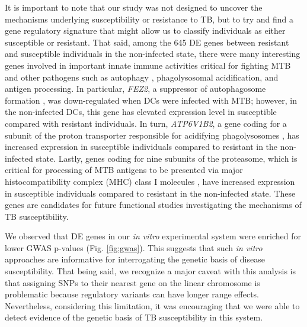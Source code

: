 \documentclass[fleqn,10pt]{wlscirep}
\begin{document}
It is important to note that our study was not designed to uncover the
mechanisms underlying susceptibility or resistance to TB, but to try
and find a gene regulatory signature that might allow us to classify
individuals as either susceptible or resistant. That said, among the
645 DE genes between resistant and susceptible individuals in the
non-infected state, there were many interesting genes involved in
important innate immune activities critical for fighting MTB and other
pathogens such as autophagy \cite{Deretic2014, Castrejon-Jimenez2015},
phagolysosomal acidification, and antigen processing. In particular,
\emph{FEZ2}, a suppressor of autophagosome formation \cite{Spang2014},
was down-regulated when DCs were infected with MTB; however, in the
non-infected DCs, this gene has elevated expression level in
susceptible compared with resistant individuals. In turn,
\emph{ATP6V1B2}, a gene coding for a subunit of the proton transporter
responsible for acidifying phagolysosomes \cite{Sturgill-Koszycki1994,
Hornef2002, Hestvik2005}, has increased expression in susceptible
individuals compared to resistant in the non-infected state. Lastly,
genes coding for nine subunits of the proteasome, which is critical
for processing of MTB antigens to be presented via major
histocompatibility complex (MHC) class I molecules \cite{Flynn1992,
Grotzke2009, Grotzke2010, LindestamArlehamn2014}, have increased
expression in susceptible individuals compared to resistant in the
non-infected state. These genes are candidates for future functional
studies investigating the mechanisms of TB susceptibility.

We observed that DE genes in our \emph{in vitro} experimental system
were enriched for lower GWAS p-values (Fig. \ref{fig:gwas}). This
suggests that such \emph{in vitro} approaches are informative for
interrogating the genetic basis of disease susceptibility. That being
said, we recognize a major caveat with this analysis is that assigning
SNPs to their nearest gene on the linear chromosome is problematic
because regulatory variants can have longer range effects.
Nevertheless, considering this limitation, it was encouraging that we
were able to detect evidence of the genetic basis of TB susceptibility
in this system.
\end{document}
